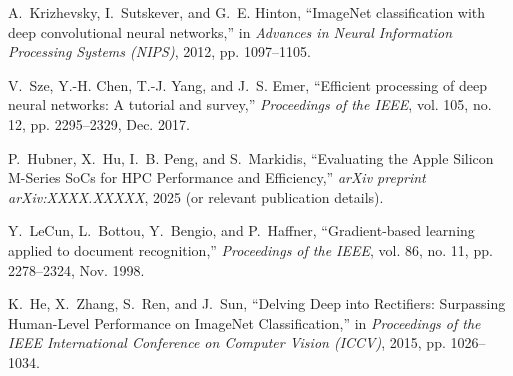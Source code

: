 \documentclass[conference]{IEEEtran} %
\begin{document}
\begin{thebibliography}{1} %

A.~Krizhevsky, I.~Sutskever, and G.~E. Hinton, ``ImageNet classification with deep convolutional neural networks,'' in \emph{Advances in Neural Information Processing Systems (NIPS)}, 2012, pp. 1097--1105.

V.~Sze, Y.-H. Chen, T.-J. Yang, and J.~S. Emer, ``Efficient processing of deep neural networks: A tutorial and survey,'' \emph{Proceedings of the IEEE}, vol. 105, no. 12, pp. 2295--2329, Dec. 2017.

P.~Hubner, X.~Hu, I.~B. Peng, and S.~Markidis, ``Evaluating the Apple Silicon M-Series SoCs for HPC Performance and Efficiency,'' \emph{arXiv preprint arXiv:XXXX.XXXXX}, 2025 (or relevant publication details).

Y.~LeCun, L.~Bottou, Y.~Bengio, and P.~Haffner, ``Gradient-based learning applied to document recognition,'' \emph{Proceedings of the IEEE}, vol. 86, no. 11, pp. 2278--2324, Nov. 1998.

K.~He, X.~Zhang, S.~Ren, and J.~Sun, ``Delving Deep into Rectifiers: Surpassing Human-Level Performance on ImageNet Classification,'' in \emph{Proceedings of the IEEE International Conference on Computer Vision (ICCV)}, 2015, pp. 1026--1034.

\end{thebibliography}

\end{document}
